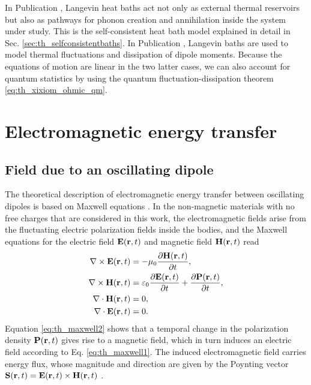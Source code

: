 In Publication , Langevin heat baths act not only as external thermal reservoirs but also as pathways for phonon creation and annihilation inside the system under study. This is the self-consistent heat bath model \cite{bolsterli70} explained in detail in Sec. \ref{sec:th_selfconsistentbaths}. In Publication , Langevin baths are used to model thermal fluctuations and dissipation of dipole moments. Because the equations of motion are linear in the two latter cases, we can also account for quantum statistics by using the quantum fluctuation-dissipation theorem \eqref{eq:th_xixiom_ohmic_qm}.


\section{Electromagnetic energy transfer}


\label{sec:theory_emtheory}

\subsection{Field due to an oscillating dipole}

The theoretical description of electromagnetic energy transfer between oscillating dipoles is based on Maxwell equations \cite{novotny}. In the non-magnetic materials with no free charges that are considered in this work, the electromagnetic fields arise from the fluctuating electric polarization fields inside the bodies, and the Maxwell equations for the electric field $\mathbf{E}(\mathbf{r},t)$ and magnetic field $\mathbf{H}(\mathbf{r},t)$ read \cite{novotny}
\begin{subequations}
\begin{align}
  \nabla \times \mathbf{E}(\mathbf{r},t) &= - \mu_0 \frac{\partial \mathbf{H}(\mathbf{r},t)}{\partial t}, \label{eq:th_maxwell1} \\
  \nabla \times \mathbf{H}(\mathbf{r},t) &= \varepsilon_0 \frac{\partial \mathbf{E}(\mathbf{r},t)}{\partial t} + \frac{\partial \mathbf{P}(\mathbf{r},t)}{\partial t}, \label{eq:th_maxwell2} \\
   \nabla \cdot \mathbf{H}(\mathbf{r},t) &= 0, \\
   \nabla \cdot \mathbf{E}(\mathbf{r},t) &= 0.
\end{align}
\end{subequations}
Equation \eqref{eq:th_maxwell2} shows that a temporal change in the polarization density $\mathbf{P}(\mathbf{r},t)$ gives rise to a magnetic field, which in turn induces an electric field according to Eq. \eqref{eq:th_maxwell1}. The induced electromagnetic field carries energy flux, whose magnitude and direction are given by the Poynting vector $\mathbf{S}(\mathbf{r},t)=\mathbf{E}(\mathbf{r},t)\times \mathbf{H}(\mathbf{r},t)$ \cite{novotny}.

